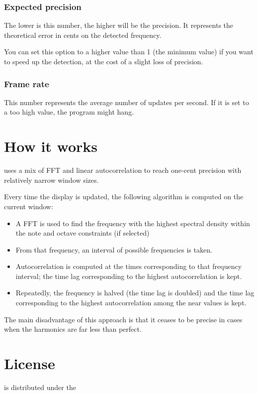\subsection{Expected precision}\label{expectedprecision}

The lower is this number, the higher will be the precision. It represents the
theoretical error in cents on the detected frequency.

You can set this option to a higher value than 1 (the minimum value)
if you want to speed up the detection, at the cost of a slight loss of precision.

\subsection{Frame rate}\label{framerate}

This number represents the average number of updates per second. If it is set to 
a too high value, the program might hang.

\chapter{How it works}\label{howitworks}

 uses a mix of FFT and linear autocorrelation to reach one-cent precision with relatively narrow window sizes.

Every time the display is updated, the following algorithm is computed on the current window:

\begin{itemize}
  \item A FFT is used to find the frequency with the highest spectral density within the note and octave constraints (if selected)
  \item From that frequency, an interval of possible frequencies is taken.
  \item Autocorrelation is computed at the times corresponding to that frequency interval; the time lag corresponding to the highest autocorrelation is kept.
  \item Repeatedly, the frequency is halved (the time lag is doubled) and the time lag corresponding to the highest autocorrelation among the near values is kept.
\end{itemize}

The main disadvantage of this approach is that it ceases to be precise in cases when the harmonics are far less than perfect.

\appendix

\chapter{License}\label{license}

 is distributed under the 




